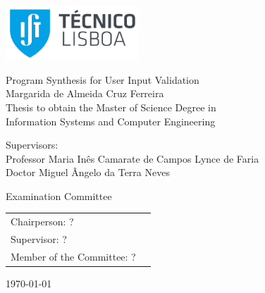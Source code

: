 \thispagestyle {empty}

\includegraphics[width=5cm]{pictures/IST_A.pdf}

\begin{center}

\vspace{2.5cm}
\vspace{1.0cm}
{\FontLb Program Synthesis for User Input Validation} \\
\vspace{2.7cm}
{\FontMb Margarida de Almeida Cruz Ferreira} \\
\vspace{2.0cm}
{\FontSn Thesis to obtain the Master of Science Degree in} \\
\vspace{0.3cm}
{\FontLb Information Systems and Computer Engineering} \\
\vspace{1.1cm}
{\FontSn %
	Supervisors:\\
	Professor Maria Inês Camarate de Campos Lynce de Faria\\
	Doctor Miguel Ângelo da Terra Neves

}
\vspace{1.1cm}

{\FontMb Examination Committee} \\

\vspace{0.5cm}

{
\FontSn %
\begin{tabular}{ll}
Chairperson: ? \\
Supervisor: ? \\
Member of the Committee: ? \\
\end{tabular}
}

\vspace{1.5cm}

{\FontMb \monthyeardate\today}


\end{center}

\cleardoublepage

